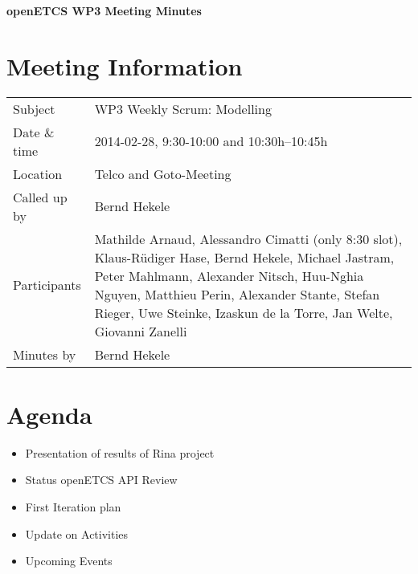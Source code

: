 \documentclass[a4paper, 11pt]{article}
\begin{document}
{\begin{center}\huge\bf openETCS WP3 Meeting Minutes\end{center}}
\section{Meeting Information}

\renewcommand{\arraystretch}{1.5}
\begin{supertabular}{m{.2\textwidth}m{.8\textwidth}}
Subject & WP3 Weekly Scrum: Modelling\\
Date \& time & 2014-02-28, 9:30-10:00 and  10:30h--10:45h\\
Location & Telco and Goto-Meeting\\
Called up by & Bernd Hekele\\
Participants &
Mathilde Arnaud,
Alessandro Cimatti (only 8:30 slot),
Klaus-R\"udiger Hase,
Bernd Hekele,
Michael Jastram,
Peter Mahlmann,
Alexander Nitsch,
Huu-Nghia Nguyen,
Matthieu Perin,
Alexander Stante,
Stefan Rieger,
Uwe Steinke,
Izaskun de la Torre,
Jan Welte,
Giovanni Zanelli
\\

Minutes by & Bernd Hekele\\
\end{supertabular}
\renewcommand{\arraystretch}{1.0}


\section{{Agenda}}
\begin{itemize}
\item Presentation of results of Rina project
\item Status openETCS API Review
\item First Iteration plan
\item Update on Activities
\item Upcoming Events\\
\end{itemize}
\end{document}
